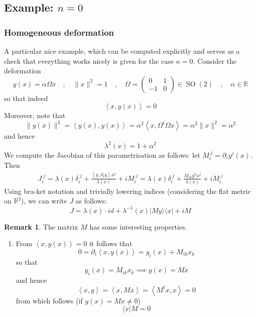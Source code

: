 \documentclass[a4paper,11pt]{article}
\theoremstyle{definition}
\newtheorem{remark}{Remark}
\newcommand{\RR}{\mathbb{R}}
\DeclareMathOperator{\SO}{SO}
\newcommand{\del}{\partial}
\newcommand{\ket}[1]{\lvert #1 \rangle}
\newcommand{\bra}[1]{\langle #1 \rvert}
\newcommand{\mat}[4]{\begin{pmatrix} #1 & #2 \\ #3 & #4 \end{pmatrix}}
\begin{document}
\subsection{Example: \texorpdfstring{$n=0$}{n=0}}
\subsubsection{Homogeneous deformation}
A particular nice example, which can be computed explicitly and serves as a check that everything works nicely is given for the case $n=0$.
Consider the deformation 
\begin{equation}
  y(x) = \alpha \Omega x \quad , \quad \lVert x \rVert^2 = 1\quad , \quad \Omega = \mat{0}{1}{-1}{0} \in \SO(2) \quad , \quad \alpha \in \RR
  \label{eq:toy_cst_def}
\end{equation}
so that indeed 
\begin{equation}
  \left\langle x, y(x) \right\rangle = 0
\end{equation}
Moreover, note that 
\begin{equation}
  \lVert y(x) \rVert^2 = \left\langle y(x), y(x) \right\rangle = \alpha^2 \left\langle x, \Omega^t \Omega x \right\rangle = \alpha^2 \lVert x \rVert^2 = \alpha^2
\end{equation}
and hence 
\begin{equation}
  \lambda^2(x) = 1 + \alpha^2
\end{equation}
We compute the Jacobian of this parametrisation as follows: let $M_{i}^{\;j} = \del_i y^j(x)$.
Then 
\begin{equation}
  \begin{split} 
    J_i^{\;j} = \lambda(x) \delta_{i}^{\;j} + \frac{\left\langle y, \del_i y \right\rangle x^j}{\lambda(x)} + i M_i^{\;j} =  \lambda(x) \delta_{i}^{\;j} + \frac{M_{ik}y^k x^j}{\lambda(x)} + i M_i^{\;j}
  \end{split}
\end{equation}
Using bra-ket notation and trivially lowering indices (considering the flat metric on $\RR^2$), we can write $J$ as follows:
\begin{equation}
  J = \lambda(x) \cdot id + \lambda^{-1}(x) \ket{My}\bra{x} + i M
\end{equation}
\begin{remark}
  The matrix $M$ has some interesting properties.
  \begin{enumerate}
    \item From $\left\langle x, y(x) \right\rangle = 0$ it follows that
      \[
      0 = \del_i \left\langle x, y(x) \right\rangle = y_i(x) + M_{ik} x_k
      \] 
      so that 
      \[
	y_i(x) = M_{ik} x_k \implies y(x) = Mx
      \] 
      and hence
      \[
	\left\langle x, y \right\rangle = \left\langle x , Mx \right\rangle = \left\langle M^t x, x \right\rangle = 0
      \] 
      from which follows (if $y(x) = Mx \neq 0$)
      \[
	\bra{x} M = 0
      \] 
  \end{enumerate}
\end{remark}
\end{document}
